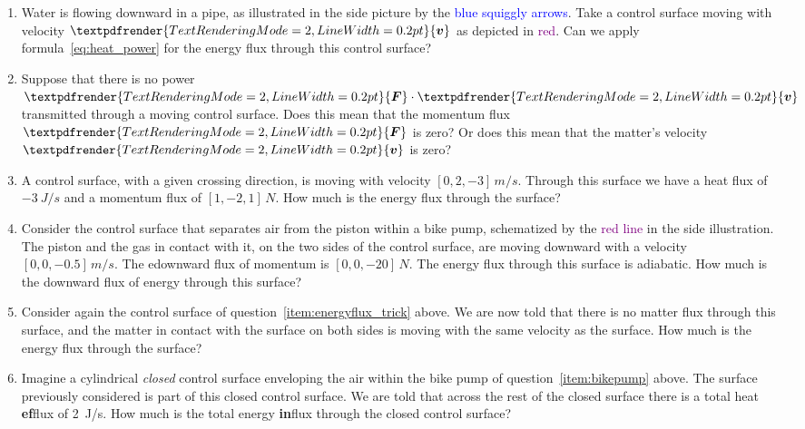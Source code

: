 \documentclass[a4paper,12pt,%
onecolumn,oneside,%
british%
]{memoir}
\renewcommand*{\bm}[1]{\textpdfrender{TextRenderingMode=2,LineWidth=0.2pt}{\boldsymbol{#1}}}
\renewcommand*{\|}[1][]{\nonscript\:#1\vert\nonscript\:\mathopen{}}
\newcommand*{\yv}{\bm{v}}
\newcommand*{\yF}{\bm{F}}
\begin{document}
\begin{exercise}
  \begin{enumerate}[exerc]
  \item Water is flowing downward in a pipe, as illustrated in the side picture by the \textcolor{blue}{blue squiggly arrows}. Take a control surface moving with velocity $\yv$ as depicted in \textcolor{purple}{red}. Can we apply  formula~\eqref{eq:heat_power} for the energy flux through this control surface?

  \item Suppose that there is no power $\yF\cdot\yv$ transmitted through a moving control surface. Does this mean that the momentum flux $\yF$ is zero? Or does this mean that the matter's velocity $\yv$ is zero?

  \item\label{item:energyflux_trick} A control surface, with a given crossing direction, is moving with velocity $[0,2,-3]\,\unit{m/s}$. Through this surface we have a heat flux of $\qty{-3}{J/s}$ and a momentum flux of $[1,-2,1]\,\unit{N}$. How much is the energy flux through the surface?

  \item\label{item:bikepump} Consider the control surface that separates air from the piston within a bike pump, schematized by the \textcolor{purple}{red line} in the side illustration. The piston and the gas in contact with it, on the two sides of the control surface, are moving downward with a velocity $[0,0,-0.5]\,\unit{m/s}$. The edownward flux of momentum is $[0,0,-20]\,\unit{N}$. The energy flux through this surface is adiabatic. How much is the downward flux of energy through this surface?

  \item Consider again the control surface of question~\ref{item:energyflux_trick} above. We are now told that there is no matter flux through this surface, and the matter in contact with the surface on both sides is moving with the same velocity as the surface. How much is the energy flux through the surface?

  \item Imagine a cylindrical \emph{closed} control surface enveloping the air within the bike pump of question~\ref{item:bikepump} above. The surface previously considered is part of this closed control surface. We are told that across the rest of the closed surface there is a total heat \textbf{ef}flux of \qty{2}{J/s}. How much is the total energy \textbf{in}flux through the closed control surface?
  \end{enumerate}
\end{exercise}
\end{document}

